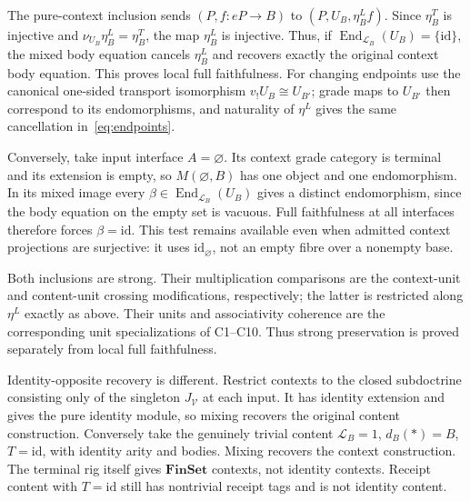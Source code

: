 \documentclass[11pt,a4paper]{article}
\theoremstyle{definition}
\newcommand{\V}{\mathcal V}
\newcommand{\Lcat}{\mathcal L}
\newcommand{\id}{\mathrm{id}}
\newcommand{\End}{\operatorname{End}}
\newcommand{\FinSet}{\mathbf{FinSet}}
\begin{document}
The pure-context inclusion sends $(P,f:eP\to B)$ to
$(P,U_B,\eta^L_B f)$. Since $\eta^T_B$ is injective and
$\nu_{U_B}\eta^L_B=\eta^T_B$, the map $\eta^L_B$ is injective. Thus, if
$\End_{\Lcat_B}(U_B)=\{\id\}$, the mixed body equation cancels
$\eta^L_B$ and recovers exactly the original context body equation. This
proves local full faithfulness. For changing endpoints use the canonical
one-sided transport isomorphism $v_!U_B\cong U_{B'}$; grade maps to $U_{B'}$
then correspond to its endomorphisms, and naturality of $\eta^L$ gives the
same cancellation in~\eqref{eq:endpoints}.

Conversely, take input interface $A=\varnothing$. Its context grade category
is terminal and its extension is empty, so $M(\varnothing,B)$ has one object
and one endomorphism. In its mixed image every
$\beta\in\End_{\Lcat_B}(U_B)$ gives a distinct endomorphism, since the body
equation on the empty set is vacuous. Full faithfulness at all interfaces
therefore forces $\beta=\id$. This test remains available even when admitted
context projections are surjective: it uses $\id_\varnothing$, not an empty
fibre over a nonempty base.

Both inclusions are strong. Their multiplication comparisons are the
context-unit and content-unit crossing modifications, respectively; the latter
is restricted along $\eta^L$ exactly as above. Their units and associativity
coherence are the corresponding unit specializations of C1--C10. Thus strong
preservation is proved separately from local full faithfulness.

Identity-opposite recovery is different. Restrict contexts to the closed
subdoctrine consisting only of the singleton $J_\V$ at each input. It has
identity extension and gives the pure identity module, so mixing recovers the
original content construction. Conversely take the genuinely trivial content
$\Lcat_B=1$, $d_B(*)=B$, $T=\id$, with identity arity and bodies. Mixing
recovers the context construction. The terminal rig itself gives $\FinSet$
contexts, not identity contexts. Receipt content with $T=\id$ still has
nontrivial receipt tags and is not identity content.
\end{document}

